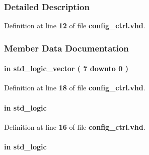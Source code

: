 \subsubsection{Detailed Description}


Definition at line {\bf 12} of file {\bf config\+\_\+ctrl.\+vhd}.



\subsubsection{Member Data Documentation}
\paragraph[{addr}]{ {\bfseries \textcolor{keywordflow}{in}\textcolor{vhdlchar}{ }} {\bfseries \textcolor{comment}{std\+\_\+logic\+\_\+vector}\textcolor{vhdlchar}{ }\textcolor{vhdlchar}{(}\textcolor{vhdlchar}{ }\textcolor{vhdlchar}{ } \textcolor{vhdldigit}{7} \textcolor{vhdlchar}{ }\textcolor{keywordflow}{downto}\textcolor{vhdlchar}{ }\textcolor{vhdlchar}{ } \textcolor{vhdldigit}{0} \textcolor{vhdlchar}{ }\textcolor{vhdlchar}{)}\textcolor{vhdlchar}{ }} \hspace{0.3cm}{\ttfamily [Port]}}\label{classconfig__ctrl_ac89b3a702fcba6cc507cf4a6058d8d20}


Definition at line {\bf 18} of file {\bf config\+\_\+ctrl.\+vhd}.

\paragraph[{busy}]{ {\bfseries \textcolor{keywordflow}{in}\textcolor{vhdlchar}{ }} {\bfseries \textcolor{comment}{std\+\_\+logic}\textcolor{vhdlchar}{ }} \hspace{0.3cm}{\ttfamily [Port]}}\label{classconfig__ctrl_a8130d0e36fc6f590839eaee9d2d88ea0}


Definition at line {\bf 16} of file {\bf config\+\_\+ctrl.\+vhd}.

\paragraph[{clk}]{ {\bfseries \textcolor{keywordflow}{in}\textcolor{vhdlchar}{ }} {\bfseries \textcolor{comment}{std\+\_\+logic}\textcolor{vhdlchar}{ }} \hspace{0.3cm}{\ttfamily [Port]}}\label{classconfig__ctrl_a4a4609c199d30b3adebbeb3a01276ec5}


